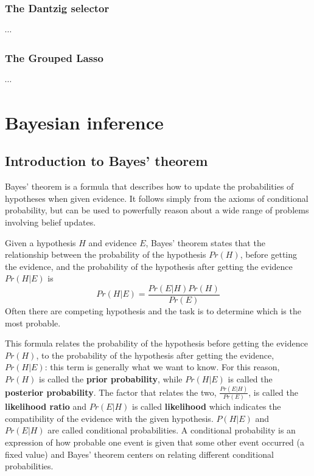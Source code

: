 \documentclass[12pt, letterpaper]{article}
\theoremstyle{definition}
\begin{document}
\subsubsection{The Dantzig selector}
$\cdots$

\subsubsection{The Grouped Lasso}
$\cdots$
\newpage
\section{Bayesian inference}

\subsection{Introduction to Bayes' theorem}
Bayes' theorem is a formula that describes how to update the probabilities of hypotheses when given evidence. It follows simply from the axioms of conditional probability, but can be used to powerfully reason about a wide range of problems involving belief updates.

Given a hypothesis $H$ and evidence $E$, Bayes' theorem states that the relationship between the probability of the hypothesis $Pr(H)$, before getting the evidence, and the probability of the hypothesis after getting the evidence $Pr(H|E)$ is
\begin{equation}
Pr(H|E) = \frac{Pr(E|H)Pr(H)}{Pr(E)}
\end{equation}
Often there are competing hypothesis and the task is to determine which is the most probable.

This formula relates the probability of the hypothesis before getting the evidence $Pr(H)$, to the probability of the hypothesis after getting the evidence, $Pr(H|E)$: this term is generally what we want to know. For this reason, $Pr(H)$ is called the \textbf{prior probability}, while 
$Pr(H|E)$ is called the \textbf{posterior probability}. The factor that relates the two, $\frac{Pr(E|H)}{Pr(E)}$, is called the \textbf{likelihood ratio} and $Pr(E|H)$ is called \textbf{likelihood} which indicates the compatibility of the evidence with the given hypothesis.
$P(H|E)$ and $Pr(E|H)$ are called conditional probabilities. A conditional probability is an expression of how probable one event is given that some other event occurred (a fixed value) and Bayes' theorem centers on relating different conditional probabilities.
\end{document}
